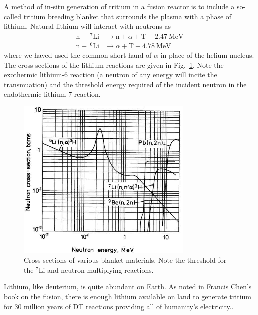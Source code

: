 A method of in-situ generation of tritium in a fusion reactor is to include a so-called tritium breeding blanket that surrounds the plasma with a phase of lithium. Natural lithium will interact with neutrons as
\begin{subequations}\label{eq:lithium-t}
\begin{align}
	\mathrm{n} + \ ^7\mathrm{Li} &\xrightarrow \ \mathrm{n}+\alpha + \mathrm{T} -2.47\ \text{MeV}\label{eq:li7-t}\\
	\mathrm{n} + \ ^6\mathrm{Li} &\xrightarrow \  \alpha + \mathrm{T} +4.78\ \text{MeV} \label{eq:li6-t}
\end{align}
\end{subequations}
where we haved used the common short-hand of $\alpha$ in place of the helium nucleus. The cross-sections of the lithium reactions are given in Fig.~\ref{fig:li-xsects}. Note the exothermic lithium-6 reaction (a neutron of any energy will incite the transmuation) and the threshold energy required of the incident neutron in the endothermic lithium-7 reaction.

\begin{figure}
	\centering
	\includegraphics[width=0.75\textwidth]{chapters/figures/breeding_xsecs} 
	\caption{Cross-sections of various blanket materials. Note the threshold for the $^7$Li and neutron multiplying reactions.}
	\label{fig:li-xsects}
\end{figure}

Lithium, like deuterium, is quite abundant on Earth. As noted in Francis Chen's book on the fusion, there is enough lithium available on land to generate tritium for 30 million years of DT reactions providing all of humanity's electricity.\cite{Chen2011}. 

